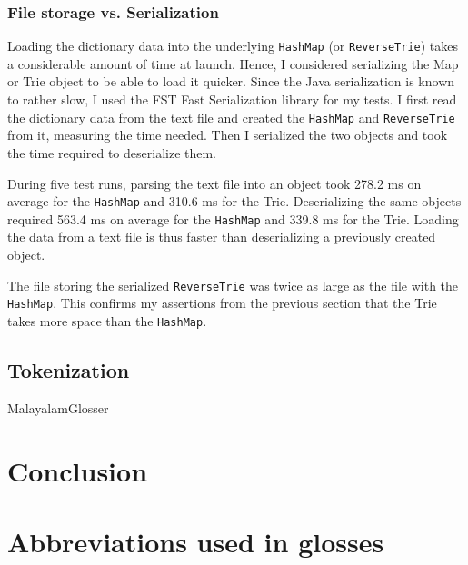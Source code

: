 \documentclass[a4paper]{article}
\newcommand{\typ}[1]{\texttt{#1}}
\begin{document}
\subsubsection*{File storage vs. Serialization}

Loading the dictionary data into the underlying \typ{HashMap} (or \typ{ReverseTrie}) takes a considerable amount of time at launch. Hence, I considered serializing the Map or Trie object to be able to load it quicker. Since the Java serialization is known to rather slow, I used the FST Fast Serialization library for my tests. I first read the dictionary data from the text file and created the \typ{HashMap} and \typ{ReverseTrie} from it, measuring the time needed. Then I serialized the two objects and took the time required to deserialize them.

During five test runs, parsing the text file into an object took 278.2 ms on average for the \typ{HashMap} and 310.6 ms for the Trie. Deserializing the same objects required 563.4 ms on average for the \typ{HashMap} and 339.8 ms for the Trie. Loading the data from a text file is thus faster than deserializing a previously created object.

The file storing the serialized \typ{ReverseTrie} was twice as large as the file with the \typ{HashMap}. This confirms my assertions from the previous section that the Trie takes more space than the \typ{HashMap}.


\subsection{Tokenization}

MalayalamGlosser

\section{Conclusion}

\printbibliography
\clearpage

\appendix

\section{Abbreviations used in glosses}
\end{document}
